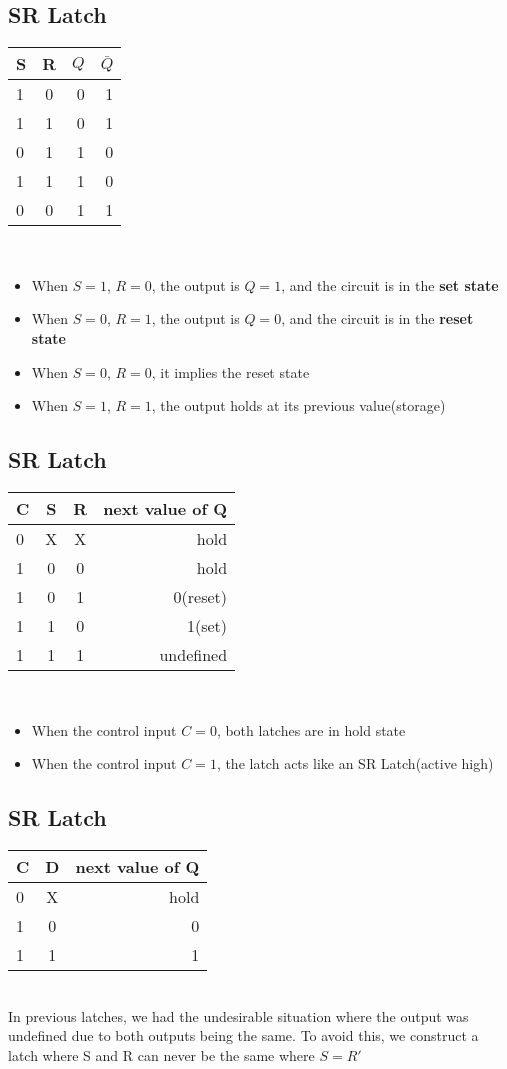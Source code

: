 \documentclass[12pt]{report}
\begin{document}
	 	\subsection{SR Latch}
			\begin{tabular}{ l | c || r | r }
				S & R & $Q$ & $\bar{Q}$\\
				\hline
				1 & 0 & 0 & 1 \\
				1 & 1 & 0 & 1 \\
				0 & 1 & 1 & 0 \\
				1 & 1 & 1 & 0 \\
				0 & 0 & 1 & 1 \\
			\end{tabular}
			\\
			\begin{itemize}
			\item When $S = 1$, $R=0$, the output is $Q = 1$, and the circuit is in the \textbf{set state}
			\item When $S = 0$, $R=1$, the output is $Q = 0$, and the circuit is in the \textbf{reset state}
			\item When $S = 0$, $R = 0$, it implies the reset state
			\item When $S = 1$, $R = 1$, the output holds at its previous value(storage)
			\end{itemize}
	 	\subsection{SR Latch}
			\begin{tabular}{ l | c | c || r }
				C & S & R & next value of Q\\
				\hline
				0 & X & X & hold \\
				1 & 0 & 0 & hold \\
				1 & 0 & 1 & 0(reset) \\
				1 & 1 & 0 & 1(set) \\
				1 & 1 & 1 & undefined \\
			\end{tabular}
			\\
			\begin{itemize}
				\item When the control input $C = 0$, both latches are in hold state
				\item When the control input $C = 1$, the latch acts like an SR Latch(active high)
			\end{itemize}
	 	\subsection{SR Latch}
			\begin{tabular}{ l | c || r }
				C & D & next value of Q\\
				\hline
				0 & X & hold \\
				1 & 0 & 0 \\
				1 & 1 & 1 \\
			\end{tabular}
			\\
			In previous latches, we had the undesirable situation where the output was undefined due to both outputs being the same. To avoid this, we construct a latch where S and R can never be the same where $S = R'$
\end{document}
